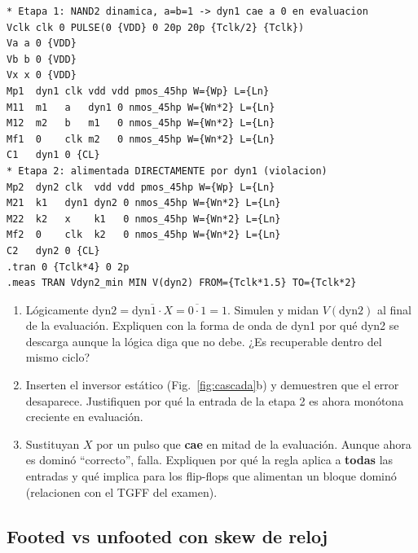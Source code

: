 \documentclass[11pt,a4paper]{article}
\begin{document}
\begin{lstlisting}
* Etapa 1: NAND2 dinamica, a=b=1 -> dyn1 cae a 0 en evaluacion
Vclk clk 0 PULSE(0 {VDD} 0 20p 20p {Tclk/2} {Tclk})
Va a 0 {VDD}
Vb b 0 {VDD}
Vx x 0 {VDD}
Mp1  dyn1 clk vdd vdd pmos_45hp W={Wp} L={Ln}
M11  m1   a   dyn1 0 nmos_45hp W={Wn*2} L={Ln}
M12  m2   b   m1   0 nmos_45hp W={Wn*2} L={Ln}
Mf1  0    clk m2   0 nmos_45hp W={Wn*2} L={Ln}
C1   dyn1 0 {CL}
* Etapa 2: alimentada DIRECTAMENTE por dyn1 (violacion)
Mp2  dyn2 clk  vdd vdd pmos_45hp W={Wp} L={Ln}
M21  k1   dyn1 dyn2 0 nmos_45hp W={Wn*2} L={Ln}
M22  k2   x    k1   0 nmos_45hp W={Wn*2} L={Ln}
Mf2  0    clk  k2   0 nmos_45hp W={Wn*2} L={Ln}
C2   dyn2 0 {CL}
.tran 0 {Tclk*4} 0 2p
.meas TRAN Vdyn2_min MIN V(dyn2) FROM={Tclk*1.5} TO={Tclk*2}
\end{lstlisting}

\begin{tarea}
\begin{enumerate}[nosep,leftmargin=*]
\item Lógicamente $\mathrm{dyn2}=\overline{\mathrm{dyn1}\cdot X}=\overline{0\cdot1}=1$. Simulen y midan $V(\mathrm{dyn2})$ al final de la evaluación. Expliquen con la forma de onda de dyn1 por qué dyn2 se descarga aunque la lógica diga que no debe. ¿Es recuperable dentro del mismo ciclo?
\item Inserten el inversor estático (Fig.~\ref{fig:cascada}b) y demuestren que el error desaparece. Justifiquen por qué la entrada de la etapa 2 es ahora monótona creciente en evaluación.
\item Sustituyan $X$ por un pulso que \textbf{cae} en mitad de la evaluación. Aunque ahora es dominó ``correcto'', falla. Expliquen por qué la regla aplica a \textbf{todas} las entradas y qué implica para los flip-flops que alimentan un bloque dominó (relacionen con el TGFF del examen).
\end{enumerate}
\end{tarea}

\subsection{Footed vs unfooted con skew de reloj}
\end{document}
